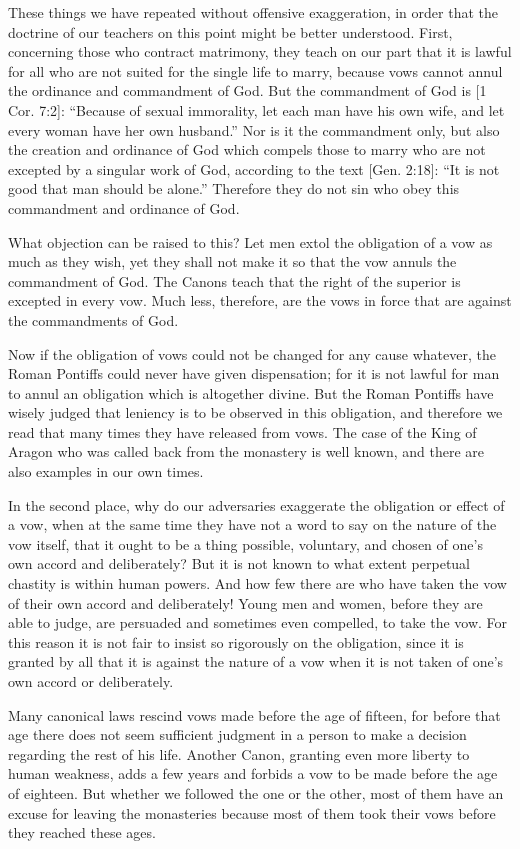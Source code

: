 These things we have repeated without offensive exaggeration, in order that the doctrine of our teachers on this point might be better understood. First, concerning those who contract matrimony, they teach on our part that it is lawful for all who are not suited for the single life to marry, because vows cannot annul the ordinance and commandment of God. But the commandment of God is [1 Cor. 7:2]: “Because of sexual immorality, let each man have his own wife, and let every woman have her own husband.” Nor is it the commandment only, but also the creation and ordinance of God which compels those to marry who are not excepted by a singular work of God, according to the text [Gen. 2:18]: “It is not good that man should be alone.” Therefore they do not sin who obey this commandment and ordinance of God.

What objection can be raised to this? Let men extol the obligation of a vow as much as they wish, yet they shall not make it so that the vow annuls the commandment of God. The Canons teach that the right of the superior is excepted in every vow. Much less, therefore, are the vows in force that are against the commandments of God.

Now if the obligation of vows could not be changed for any cause whatever, the Roman Pontiffs could never have given dispensation; for it is not lawful for man to annul an obligation which is altogether divine. But the Roman Pontiffs have wisely judged that leniency is to be observed in this obligation, and therefore we read that many times they have released from vows. The case of the King of Aragon who was called back from the monastery is well known, and there are also examples in our own times.

In the second place, why do our adversaries exaggerate the obligation or effect of a vow, when at the same time they have not a word to say on the nature of the vow itself, that it ought to be a thing possible, voluntary, and chosen of one’s own accord and deliberately? But it is not known to what extent perpetual chastity is within human powers. And how few there are who have taken the vow of their own accord and deliberately! Young men and women, before they are able to judge, are persuaded and sometimes even compelled, to take the vow. For this reason it is not fair to insist so rigorously on the obligation, since it is granted by all that it is against the nature of a vow when it is not taken of one’s own accord or deliberately.

Many canonical laws rescind vows made before the age of fifteen, for before that age there does not seem sufficient judgment in a person to make a decision regarding the rest of his life. Another Canon, granting even more liberty to human weakness, adds a few years and forbids a vow to be made before the age of eighteen. But whether we followed the one or the other, most of them have an excuse for leaving the monasteries because most of them took their vows before they reached these ages.

